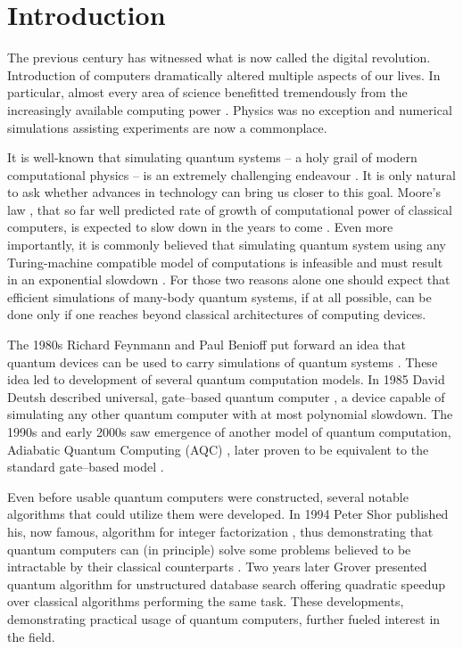\chapter*{Introduction}
The previous century has witnessed what is now called the digital revolution. Introduction of computers dramatically altered multiple aspects of our lives. In particular, almost every area of science benefitted tremendously from the increasingly available computing power \cite{winsberg}. Physics was no exception and numerical simulations assisting experiments are now a commonplace.

It is well-known that simulating quantum systems -- a holy grail of modern computational physics -- is an extremely challenging endeavour \cite{feynman.82}. It is only natural to ask whether advances in technology can bring us closer to this goal.  Moore's law \cite{mack}, that so far well predicted rate of growth of computational power of classical computers, is expected to slow down in the years to come \cite{waldrop, kumar}. Even more importantly, it is commonly believed that simulating quantum system using any Turing-machine compatible model of computations is infeasible and must result in an exponential slowdown \cite{feynman.82, poplavskii}. For those two reasons alone one should expect that efficient simulations of many-body quantum systems, if at all possible, can be done only if one reaches beyond classical architectures of computing devices.

The 1980s Richard Feynmann and Paul Benioff put forward an idea that quantum devices can be used to carry simulations of quantum systems \cite{feynman.82,benioff.80}. These idea led to development of several quantum computation models. In 1985 David Deutsh described universal, gate--based quantum computer  \cite{deutsch}, a device capable of simulating any other quantum computer with at most polynomial slowdown. The 1990s and early 2000s saw emergence of another model of quantum computation, Adiabatic Quantum Computing (AQC) \cite{kadowaki,farhi}, later proven to be equivalent to the standard gate--based model \cite{aharonov}.

Even before usable quantum computers were constructed, several notable algorithms that could utilize them were developed. In 1994 Peter Shor published his, now famous, algorithm for integer factorization \cite{shor}, thus demonstrating that quantum computers can (in principle) solve some problems believed to be intractable by their classical counterparts \cite{kleinjung}. Two years later Grover presented quantum algorithm for unstructured database search \cite{grover} offering quadratic speedup over classical algorithms performing the same task. These developments, demonstrating practical usage of quantum computers, further fueled interest in the field.

